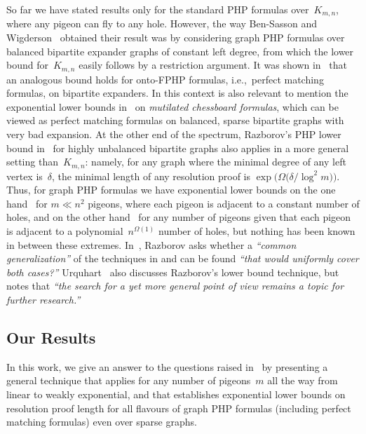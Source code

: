 \documentclass{theoretics}
\newcommand{\Bigomega}[1]{\Omega \bigl( #1 \bigr)}
\newcommand{\bigomega}[1]{\Omega ( #1 )}
\newcommand{\introduceterm}[1]{{\emph{#1}}}
\newcommand{\ie}{i.e.,\ }
\newcommand{\quotepaper}[1]{\emph{``#1''}}
\newcommand{\squeezesubsection}[1]{\subsection{#1}}
\numberwithin{equation}{section}
\begin{document}
So far we have stated results only for the standard PHP formulas
over~$K_{m,n}$, where any pigeon can fly to any hole. 
However, the way Ben-Sasson and Wigderson~\cite{BW01ShortProofs}
obtained their result was by considering graph PHP formulas over balanced
bipartite expander graphs of constant left degree, from which the
lower bound for~$K_{m,n}$ easily follows by a restriction argument.
It was shown in~\cite{IOSS16} that an analogous bound holds for
onto-FPHP formulas, \ie perfect matching formulas, on bipartite expanders.
In this context is also relevant to mention the exponential lower
bounds in~\cite{Alekhnovich04Mutilated,DR01Planar} on 
\introduceterm{mutilated chessboard formulas}, which can be
viewed as perfect matching formulas on balanced, sparse bipartite
graphs with very bad expansion.
At the other end of the spectrum, Razborov's PHP lower bound
in~\cite{Razborov04ResolutionLowerBoundsPM} for highly unbalanced
bipartite graphs also applies in a more general  setting
than~$K_{m,n}$: namely, for 
any graph where the minimal degree of any left vertex
is~$\delta$, the minimal length of any resolution proof is
$\exp \bigl( \Bigomega{\delta / \log^2 m} \bigr)$.
Thus, for graph PHP formulas we have exponential lower bounds
on the one hand~\cite{BW01ShortProofs}
for $m \ll n^2$ pigeons, where each pigeon is
adjacent to a constant number of holes,
and on the other
hand~\cite{Razborov04ResolutionLowerBoundsPM} for
any number of pigeons
given that each pigeon is adjacent to a polynomial~$n^{\bigomega{1}}$
number of holes,
but nothing has been known in between these extremes.
In~\cite{Razborov04ResolutionLowerBoundsPM}, Razborov asks whether a
\quotepaper{common generalization} of the techniques in
\cite{BW01ShortProofs}
and
\cite{Razborov04ResolutionLowerBoundsPM,Razborov03ResolutionLowerBoundsWFPHP}
can be found
\quotepaper{that would uniformly cover both cases?}
Urquhart~\cite{Urquhart07WidthVsSize} also discusses Razborov's lower
bound technique, but notes that
\quotepaper{the search for a yet more general point of view remains a topic for
further research.}





   
\squeezesubsection{Our Results}

In this work, we give an answer to the questions raised
in~\cite{Razborov04ResolutionLowerBoundsPM,Urquhart07WidthVsSize} by
presenting a general technique that applies for any number of
pigeons~$m$ all the way from linear to weakly exponential, and that
establishes exponential lower bounds on resolution proof length for
all flavours of graph PHP formulas (including perfect matching
formulas) even over sparse graphs.
\end{document}
